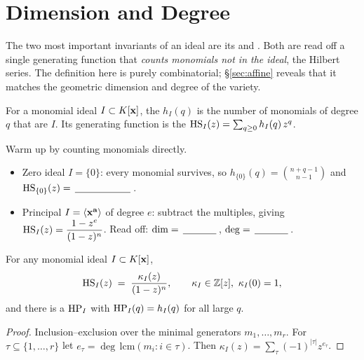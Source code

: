 \section{Dimension and Degree}\label{sec:dimdeg}
\quad{}

\begin{strand}
The two most important invariants of an ideal are its  and .
Both are read off a single generating function that \emph{counts monomials not in the ideal}, the
Hilbert series. The definition here is purely combinatorial; §\ref{sec:affine} reveals that it
matches the geometric dimension and degree of the variety.
\end{strand}


\begin{definition}\label{def:hilbert}
For a monomial ideal $I\subset K[\xb]$, the  $h_I(q)$ is the number of
monomials of degree $q$ that are \fillin[3cm] $I$. Its generating function is the
 $\HS_I(z)=\sum_{q\ge0} h_I(q)\,z^q$.
\end{definition}

\begin{yourturn}
Warm up by counting monomials directly.
\begin{itemize}[leftmargin=1.3em,itemsep=1pt]
  \item Zero ideal $I=\{0\}$: every monomial survives, so $h_{\{0\}}(q)=\binom{n+q-1}{n-1}$ and
        $\HS_{\{0\}}(z)=\fillin[2cm]$. 
  \item Principal $I=\gen{\xb^{\mathbf a}}$ of degree $e$: subtract the multiples, giving
        $\HS_I(z)=\dfrac{1-z^{e}}{(1-z)^{n}}$. Read off: $\dim=\fillin[1.2cm]$, $\deg=\fillin[1.2cm]$.
\end{itemize}
\end{yourturn}

\begin{theorem}\label{thm:hs}
For any monomial ideal $I\subset K[\xb]$,
\[
  \HS_I(z)\;=\;\frac{\kappa_I(z)}{(1-z)^{n}},\qquad \kappa_I\in\Z[z],\ \kappa_I(0)=1,
\]
and there is a  $\HP_I$ with $\HP_I(q)=h_I(q)$ for all large $q$.
\end{theorem}
\begin{proof}
Inclusion--exclusion over the minimal generators $m_1,\dots,m_r$. For $\tau\subseteq\{1,\dots,r\}$
let $e_\tau=\deg\,\mathrm{lcm}(m_i:i\in\tau)$. Then $\kappa_I(z)=\sum_\tau(-1)^{|\tau|}z^{e_\tau}$.
\end{proof}

